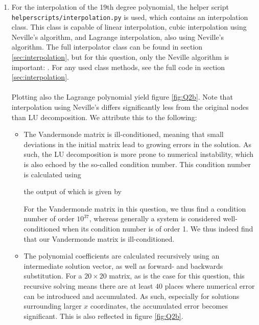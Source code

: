 \begin{enumerate}[label=(\alph*)]
\noindent
With a solution for $\bvec{c}$, a polynomial on 1000 equally-spaced points is created using

Plotting the polynomial, as well as the original nodes, yields figure \ref{fig:Q2a}
\begin{figure}[H]
    \centering
    \texttt{[image: ../figures/02\_vandermonde\_Q2a.png]}
    \caption{Polynomial found using LU decomposition of the Vandermonde matrix. Notice how the absolute difference with the initial points $y_i$ starts small, but grows for points at more positive $x$.}
    \label{fig:Q2a}
\end{figure}

\item For the interpolation of the 19th degree polynomial, the helper script \texttt{helperscripts/interpolation.py} is used, which contains an interpolation class. This class is capable of linear interpolation, cubic interpolation using Neville's algorithm, and Lagrange interpolation, also using Neville's algorithm. The full interpolator class can be found in section \ref{sec:interpolation}, but for this question, only the Neville algorithm is important:
.
For any used class methods, see the full code in section \ref{sec:interpolation}.\\
\\
Plotting also the Lagrange polynomial yield figure \ref{fig:Q2b}. Note that interpolation using Neville's differs significantly less from the original nodes than LU decomposition. We attribute this to the following:
\begin{itemize}
    \item The Vandermonde matrix is ill-conditioned, meaning that small deviations in the initial matrix lead to growing errors in the solution. As such, the LU decomposition is more prone to numerical instability, which is also echoed by the so-called condition number. This condition number is calculated using

the output of which is given by

For the Vandermonde matrix in this question, we thus find a condition number of order $10^{37}$, whereas generally a system is considered well-conditioned when its condition number is of order 1. We thus indeed find that our Vandermonde matrix is ill-conditioned.
\item The polynomial coefficients are calculated recursively using an intermediate solution vector, as well as forward- and backwards substitution. For a $20\times20$ matrix, as is the case for this question, this recursive solving means there are at least $40$ places where numerical error can be introduced and accumulated. As such, especially for solutions surrounding larger $x$ coordinates, the accumulated error becomes significant. This is also reflected in figure \ref{fig:Q2b}.
\end{itemize}


\end{enumerate}
